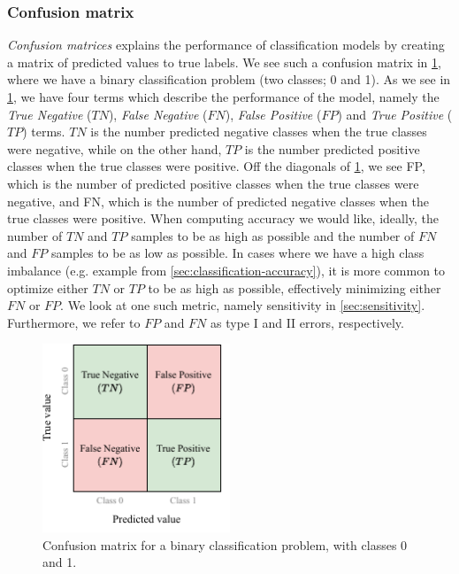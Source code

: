 \subsubsection{Confusion matrix}
\label{sec:confusion-matrix}
\textit{Confusion matrices} explains the performance of classification models by creating a matrix of predicted values to true labels. We see such a confusion matrix in \cref{fig:confusion-matrix}, where we have a binary classification problem (two classes; 0 and 1). As we see in \cref{fig:confusion-matrix}, we have four terms which describe the performance of the model, namely the \textit{True Negative} ($TN$), \textit{False Negative} ($FN$), \textit{False Positive} ($FP$) and \textit{True Positive} ($TP$) terms. $TN$ is the number predicted negative classes when the true classes were negative, while on the other hand, $TP$ is the number predicted positive classes when the true classes were positive. Off the diagonals of \cref{fig:confusion-matrix}, we see FP, which is the number of predicted positive classes when the true classes were negative, and FN, which is the number of predicted negative classes when the true classes were positive. When computing accuracy we would like, ideally, the number of $TN$ and $TP$ samples to be as high as possible and the number of $FN$ and $FP$ samples to be as low as possible. In cases where we have a high class imbalance (e.g. example from \cref{sec:classification-accuracy}), it is more common to optimize either $TN$ or $TP$ to be as high as possible, effectively minimizing either $FN$ or $FP$. We look at one such metric, namely sensitivity in \cref{sec:sensitivity}. Furthermore, we refer to $FP$ and $FN$ as type I and II errors, respectively.
\begin{figure}
    \centering
    \includegraphics[width=0.5\textwidth]{thesis/figures/confusion-matrix_cropped.pdf}
    \caption{Confusion matrix for a binary classification problem, with classes 0 and 1.}
    \label{fig:confusion-matrix}
\end{figure}

